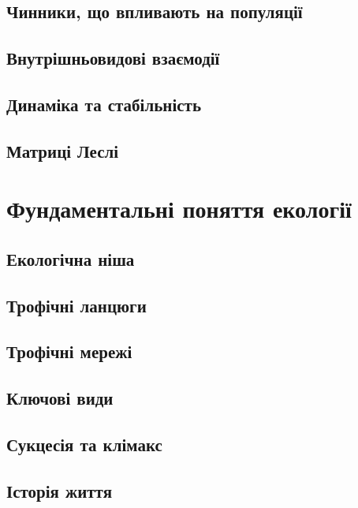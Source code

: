 \documentclass[
  11pt,
]{book}
\begin{document}
\section{Чинники, що впливають на популяції}\label{pop-factors}

\section{Внутрішньовидові взаємодії}\label{intraspecific}

\section{Динаміка та стабільність}\label{pop-dynamics}

\section{Матриці Леслі}\label{Leslie-matrix}

\chapter{Фундаментальні поняття екології}\label{foundations}

\section{Екологічна ніша}\label{niche}

\section{Трофічні ланцюги}\label{food-chain}

\section{Трофічні мережі}\label{food-webs}

\section{Ключові види}\label{keystones}

\section{Сукцесія та клімакс}\label{succession}

\section{Історія життя}\label{life-history}
\end{document}
